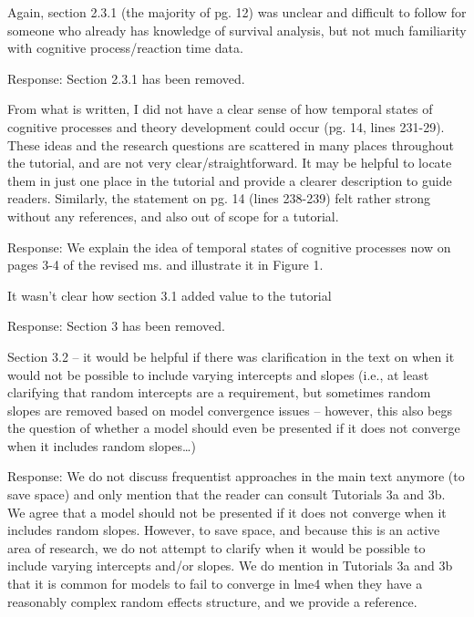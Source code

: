 \documentclass[
]{article}
\renewenvironment{quote}{\begin{leftbar}}{\end{leftbar}}
\begin{document}
\begin{quote}
Again, section 2.3.1 (the majority of pg. 12) was unclear and difficult
to follow for someone who already has knowledge of survival analysis,
but not much familiarity with cognitive process/reaction time data.
\end{quote}

Response: Section 2.3.1 has been removed.

\begin{quote}
From what is written, I did not have a clear sense of how temporal
states of cognitive processes and theory development could occur (pg.
14, lines 231-29). These ideas and the research questions are scattered
in many places throughout the tutorial, and are not very
clear/straightforward. It may be helpful to locate them in just one
place in the tutorial and provide a clearer description to guide
readers. Similarly, the statement on pg. 14 (lines 238-239) felt rather
strong without any references, and also out of scope for a tutorial.
\end{quote}

Response: We explain the idea of temporal states of cognitive processes
now on pages 3-4 of the revised ms. and illustrate it in Figure 1.

\begin{quote}
It wasn't clear how section 3.1 added value to the tutorial
\end{quote}

Response: Section 3 has been removed.

\begin{quote}
Section 3.2 -- it would be helpful if there was clarification in the
text on when it would not be possible to include varying intercepts and
slopes (i.e., at least clarifying that random intercepts are a
requirement, but sometimes random slopes are removed based on model
convergence issues -- however, this also begs the question of whether a
model should even be presented if it does not converge when it includes
random slopes\ldots)
\end{quote}

Response: We do not discuss frequentist approaches in the main text
anymore (to save space) and only mention that the reader can consult
Tutorials 3a and 3b. We agree that a model should not be presented if it
does not converge when it includes random slopes. However, to save
space, and because this is an active area of research, we do not attempt
to clarify when it would be possible to include varying intercepts
and/or slopes. We do mention in Tutorials 3a and 3b that it is common
for models to fail to converge in lme4 when they have a reasonably
complex random effects structure, and we provide a reference.
\end{document}
